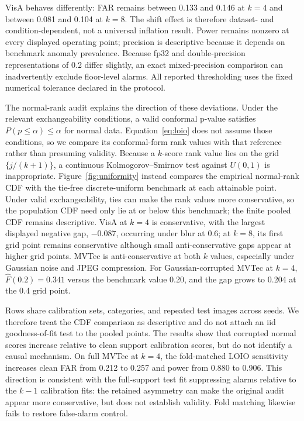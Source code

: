 VisA behaves differently: FAR remains between 0.133 and 0.146 at $k=4$ and between 0.081 and 0.104 at $k=8$. The shift effect is therefore dataset- and condition-dependent, not a universal inflation result. Power remains nonzero at every displayed operating point; precision is descriptive because it depends on benchmark anomaly prevalence. Because fp32 and double-precision representations of 0.2 differ slightly, an exact mixed-precision comparison can inadvertently exclude floor-level alarms. All reported thresholding uses the fixed numerical tolerance declared in the protocol.

The normal-rank audit explains the direction of these deviations. Under the relevant exchangeability conditions, a valid conformal p-value satisfies $P(p\leq\alpha)\leq\alpha$ for normal data. Equation~\eqref{eq:loio} does not assume those conditions, so we compare its conformal-form rank values with that reference rather than presuming validity. Because a $k$-score rank value lies on the grid $\{j/(k+1)\}$, a continuous Kolmogorov--Smirnov test against $U(0,1)$ is inappropriate. Figure~\ref{fig:uniformity} instead compares the empirical normal-rank CDF with the tie-free discrete-uniform benchmark at each attainable point. Under valid exchangeability, ties can make the rank values more conservative, so the population CDF need only lie at or below this benchmark; the finite pooled CDF remains descriptive. VisA at $k=4$ is conservative, with the largest displayed negative gap, $-0.087$, occurring under blur at 0.6; at $k=8$, its first grid point remains conservative although small anti-conservative gaps appear at higher grid points. MVTec is anti-conservative at both $k$ values, especially under Gaussian noise and JPEG compression. For Gaussian-corrupted MVTec at $k=4$, $\widehat F(0.2)=0.341$ versus the benchmark value 0.20, and the gap grows to 0.204 at the 0.4 grid point.

Rows share calibration sets, categories, and repeated test images across seeds. We therefore treat the CDF comparison as descriptive and do not attach an iid goodness-of-fit test to the pooled points. The results show that corrupted normal scores increase relative to clean support calibration scores, but do not identify a causal mechanism. On full MVTec at $k=4$, the fold-matched LOIO sensitivity increases clean FAR from 0.212 to 0.257 and power from 0.880 to 0.906. This direction is consistent with the full-support test fit suppressing alarms relative to the $k-1$ calibration fits: the retained asymmetry can make the original audit appear more conservative, but does not establish validity. Fold matching likewise fails to restore false-alarm control.

